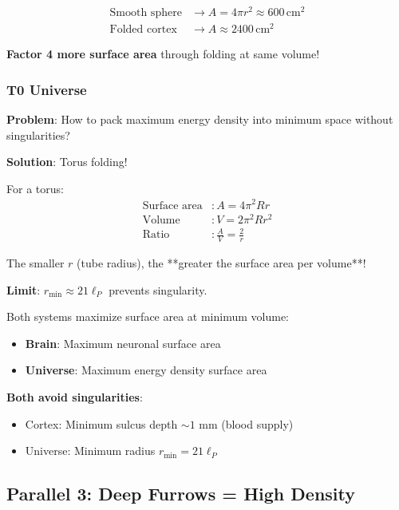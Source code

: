 	\begin{align}
		\text{Smooth sphere} &\to A = 4\pi r^2 \approx 600\,\text{cm}^2 \\
		\text{Folded cortex} &\to A \approx 2400\,\text{cm}^2
	\end{align}
	
	\textbf{Factor 4 more surface area} through folding at same volume!
	
	\subsubsection{T0 Universe}
	
	\textbf{Problem}: How to pack maximum energy density into minimum space without singularities?
	
	\textbf{Solution}: Torus folding!
	
	For a torus:
	\begin{align}
		\text{Surface area} &: A = 4\pi^2 R r \\
		\text{Volume} &: V = 2\pi^2 R r^2 \\
		\text{Ratio} &: \frac{A}{V} = \frac{2}{r}
	\end{align}
	
	The smaller $r$ (tube radius), the **greater the surface area per volume**!
	
	\textbf{Limit}: $r_{\min} \approx 21 \ell_P$ prevents singularity.
	
	\begin{keyresult}
		Both systems maximize surface area at minimum volume:
		
		\begin{itemize}
			\item \textbf{Brain}: Maximum neuronal surface area
			\item \textbf{Universe}: Maximum energy density surface area
		\end{itemize}
		
		\textbf{Both avoid singularities}:
		\begin{itemize}
			\item Cortex: Minimum sulcus depth $\sim 1$ mm (blood supply)
			\item Universe: Minimum radius $r_{\min} = 21 \ell_P$
		\end{itemize}
	\end{keyresult}
	
	\subsection{Parallel 3: Deep Furrows = High Density}
	

